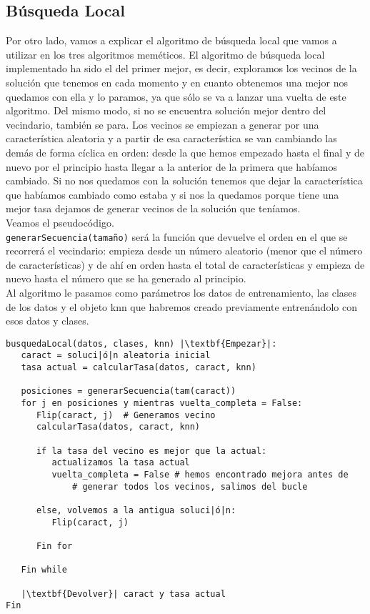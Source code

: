 \documentclass[12pt]{article}
\begin{document}
\subsection{Búsqueda Local}
Por otro lado, vamos a explicar el algoritmo de búsqueda local que vamos a utilizar en los tres algoritmos meméticos.
El algoritmo de búsqueda local implementado ha sido el del primer mejor, es decir, exploramos los vecinos de la solución que tenemos en cada momento y en cuanto obtenemos una mejor nos quedamos con ella y lo paramos, ya que sólo se va a lanzar una vuelta de este algoritmo. Del mismo modo, si no se encuentra solución mejor dentro del vecindario, también se para. Los vecinos se empiezan a generar por una característica aleatoria y a partir de esa característica se van cambiando las demás de forma cíclica en orden: desde la que hemos empezado hasta el final y de nuevo por el principio hasta llegar a la anterior de la primera que habíamos cambiado. Si no nos quedamos con la solución tenemos que dejar la característica que habíamos cambiado como estaba y si nos la quedamos porque tiene una mejor tasa dejamos de generar vecinos de la solución que teníamos.\\

Veamos el pseudocódigo.\\
\texttt{generarSecuencia(tamaño)} será la función que devuelve el orden en el que se recorrerá el vecindario: empieza desde un número aleatorio (menor que el número de características) y de ahí en orden hasta el total de características y empieza de nuevo hasta el número que se ha generado al principio.\\
Al algoritmo le pasamos como parámetros los datos de entrenamiento, las clases de los datos y el objeto knn que habremos creado previamente entrenándolo con esos datos y clases.
\begin{lstlisting}
busquedaLocal(datos, clases, knn) |\textbf{Empezar}|:
   caract = soluci|ó|n aleatoria inicial
   tasa actual = calcularTasa(datos, caract, knn)
      
   posiciones = generarSecuencia(tam(caract))
   for j en posiciones y mientras vuelta_completa = False:
      Flip(caract, j)  # Generamos vecino
      calcularTasa(datos, caract, knn)
      
      if la tasa del vecino es mejor que la actual:
         actualizamos la tasa actual
         vuelta_completa = False # hemos encontrado mejora antes de
             # generar todos los vecinos, salimos del bucle
         
      else, volvemos a la antigua soluci|ó|n:
         Flip(caract, j)
         
      Fin for
   
   Fin while
   
   |\textbf{Devolver}| caract y tasa actual
Fin
   
\end{lstlisting}
\end{document}
